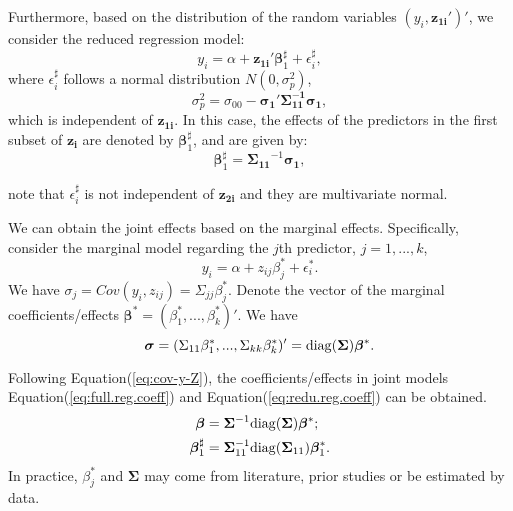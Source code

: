 Furthermore, based on the distribution of the random variables $(y_i, \boldsymbol{z_{1i}}')'$, we consider the reduced regression model:
\begin{equation}
y_i = \alpha + \boldsymbol{z_{1i}}'\boldsymbol{\beta}_1^\sharp + \epsilon_i^\sharp,
\end{equation}
where $\epsilon_i^\sharp$ follows a normal distribution $N(0,\sigma_p^2)$,
\begin{equation}\label{eq:sigmap2}
\sigma_p^2 = \sigma_{00} - \boldsymbol{\sigma_1'\Sigma^{-1}_{11}\sigma_1},
\end{equation}
which is independent of $\boldsymbol{z_{1i}}$. In this case, the effects of the predictors in the first subset of $\boldsymbol{z_i}$ are denoted by $\boldsymbol{\beta}_1^\sharp$, and are given by:
\begin{equation}
\label{eq:redu.reg.coeff}
\boldsymbol{\beta}_1^\sharp = \boldsymbol{\Sigma_{11}}^{-1}\boldsymbol{\sigma_1},
\end{equation} 

note that $\epsilon_i^\sharp$ is not independent of $\boldsymbol{z_{2i}}$ and they are multivariate normal.

We can obtain the joint effects based on the marginal effects. Specifically, consider the marginal model regarding the $j$th predictor, $j=1, ..., k$,
\begin{equation}
y_i = \alpha + z_{ij}\beta_j^* + \epsilon_i^*.
\end{equation}
We have $\sigma_j = Cov(y_i, z_{ij}) = \Sigma_{jj} \beta_j^*$. 
Denote the vector of the marginal coefficients/effects $\boldsymbol{\beta}^* = (\beta_1^*, ..., \beta_k^*)'$. We have
\begin{equation}
\label{eq:cov-y-Z}
\boldsymbol{\sigma} = (\Sigma_{11}\beta^*_1, ...,  \Sigma_{kk}\beta^*_k)' = {\rm diag}(\boldsymbol{\Sigma})\boldsymbol{\beta}^*.
\end{equation}

Following Equation(\ref{eq:cov-y-Z}), the coefficients/effects in joint models Equation(\ref{eq:full.reg.coeff}) and Equation(\ref{eq:redu.reg.coeff}) can be obtained.
\begin{align}
\label{eq:jointBetaByMarg}
\boldsymbol{\beta} &= \boldsymbol{\Sigma}^{-1}{\rm diag}(\boldsymbol{\Sigma})\boldsymbol{\beta}^*; \\
\boldsymbol{\beta}_1^\sharp &= \boldsymbol{\Sigma}_{11}^{-1} {\rm diag}(\boldsymbol{\Sigma}_{11})\boldsymbol{\beta}^*_1.
\end{align}
In practice, $\beta_j^*$ and $\boldsymbol{\Sigma}$ may come from literature, prior studies or be estimated by data.

